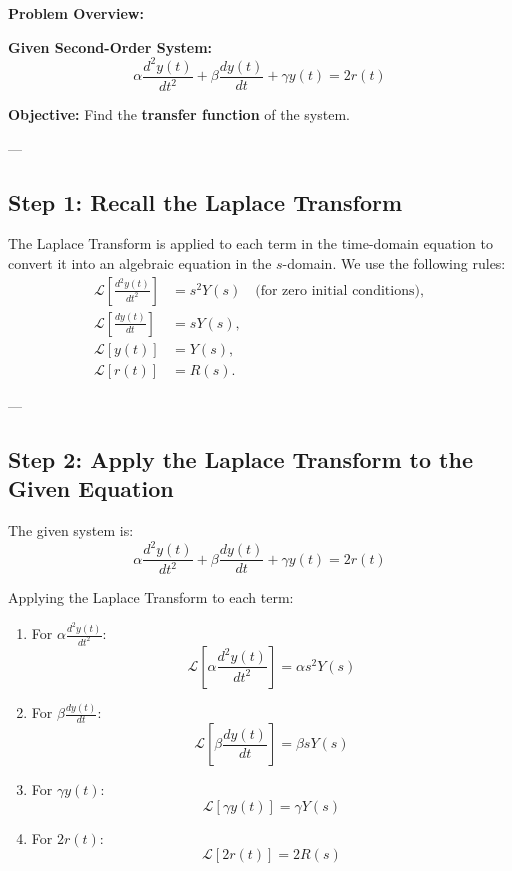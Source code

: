 \documentclass[12pt]{article}
\begin{document}
\newpage


\textbf{Problem Overview:}

\textbf{Given Second-Order System:}
\[
\alpha \frac{d^2y(t)}{dt^2} + \beta \frac{dy(t)}{dt} + \gamma y(t) = 2r(t)
\]

\textbf{Objective:}
Find the \textbf{transfer function} of the system.

---

\subsection*{Step 1: Recall the Laplace Transform}

The Laplace Transform is applied to each term in the time-domain equation to convert it into an algebraic equation in the \( s \)-domain. We use the following rules:
\begin{align*}
    \mathcal{L}\left[\frac{d^2 y(t)}{dt^2}\right] &= s^2 Y(s) \quad \text{(for zero initial conditions)}, \\
    \mathcal{L}\left[\frac{dy(t)}{dt}\right] &= s Y(s), \\
    \mathcal{L}[y(t)] &= Y(s), \\
    \mathcal{L}[r(t)] &= R(s).
\end{align*}

---

\subsection*{Step 2: Apply the Laplace Transform to the Given Equation}

The given system is:
\[
\alpha \frac{d^2y(t)}{dt^2} + \beta \frac{dy(t)}{dt} + \gamma y(t) = 2r(t)
\]

Applying the Laplace Transform to each term:

\begin{enumerate}
    \item For \( \alpha \frac{d^2y(t)}{dt^2} \):  
    \[
    \mathcal{L}\left[\alpha \frac{d^2y(t)}{dt^2}\right] = \alpha s^2 Y(s)
    \]

    \item For \( \beta \frac{dy(t)}{dt} \):  
    \[
    \mathcal{L}\left[\beta \frac{dy(t)}{dt}\right] = \beta s Y(s)
    \]

    \item For \( \gamma y(t) \):  
    \[
    \mathcal{L}[\gamma y(t)] = \gamma Y(s)
    \]

    \item For \( 2r(t) \):  
    \[
    \mathcal{L}[2r(t)] = 2R(s)
    \]
\end{enumerate}
\end{document}
